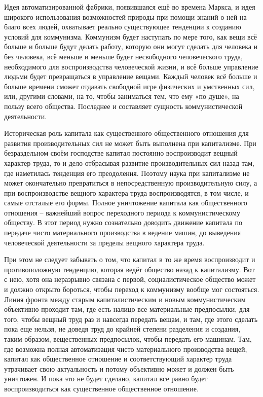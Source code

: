 \documentclass[12pt,a4paper,openany]{book}
\begin{document}
Идея автоматизированной фабрики, появившаяся ещё во времена Маркса, и идея широкого использования возможностей природы при помощи знаний о ней на благо всех людей, охватывает реально существующее тенденции к созданию условий для коммунизма. Коммунизм будет наступать по мере того, как вещи всё больше и больше будут делать работу, которую они могут сделать для человека и без человека, всё меньше и меньше будет несвободного человеческого труда, необходимого для воспроизводства человеческой жизни, и всё больше управление людьми будет превращаться в управление вещами. Каждый человек всё больше и больше времени сможет отдавать свободной игре физических и умственных сил, или, другими словами, на то, чтобы заниматься тем, что ему «по душе», на пользу всего общества. Последнее и составляет сущность коммунистической деятельности.

Историческая роль капитала как существенного общественного отношения для развития производительных сил не может быть выполнена при капитализме. При безраздельном своём господстве капитал постоянно воспроизводит вещный характер труда, то и дело отбрасывая развитие производительных сил назад там, где наметилась тенденция его преодоления. Поэтому наука при капитализме не может окончательно превратиться в непосредственную производительную силу, а при воспроизводстве вещного характера труда воспроизводятся, в том числе, и самые отсталые его формы. Полное уничтожение капитала как общественного отношения – важнейший вопрос переходного периода к коммунистическому обществу. В этот период нужно сознательно доводить движение капитала по передаче чисто материального производства в ведение машин, до выведения человеческой деятельности за пределы вещного характера труда.

При этом не следует забывать о том, что капитал в то же время воспроизводит и противоположную тенденцию, которая ведёт общество назад к капитализму. Вот с нею, хотя она неразрывно связана с первой, социалистическое общество может и должно открыто бороться, чтобы переход к коммунизму вообще мог состояться. Линия фронта между старым капиталистическим и новым коммунистическим объективно проходит там, где есть налицо все материальные предпосылки, для того, чтобы вещный труд раз и навсегда передать вещам, и там, где этого сделать пока еще нельзя, не доведя труд до крайней степени разделения и создания, таким образом, вещественных предпосылок, чтобы передать его машинам. Там, где возможна полная автоматизация чисто материального производства вещей, капитал как общественное отношение и соответствующий характер труда утрачивает свою актуальность и потому объективно может и должен быть уничтожен. И пока это не будет сделано, капитал все равно будет воспроизводиться как существенное общественное отношение.
\end{document}
